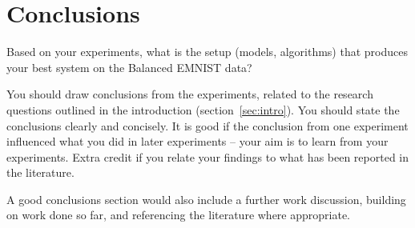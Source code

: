 \documentclass{article}
\begin{document}
\section{Conclusions}
\label{sec:concl}
Based on your experiments, what is the setup (models, algorithms) that produces your best system on the Balanced EMNIST data?  

You should draw conclusions from the experiments, related to the research questions outlined in the introduction (section~\ref{sec:intro}). You should state the conclusions clearly and concisely. It is good if the conclusion from one experiment influenced what you did in later experiments -- your aim is to learn from your experiments. Extra credit if you relate your findings to what has been reported in the literature.

A good conclusions section would also include a further work discussion, building on work done so far, and referencing the literature where appropriate.


\end{document}
